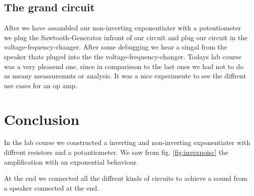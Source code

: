 \documentclass[a4paper,10pt]{article}
\numberwithin{equation}{section}
\begin{document}
\begin{multicols}{2}
  \subsection{The grand circuit}
  After we have assambled our non-inverting exponentiater with a potentiometer we plug the Sawtooth-Generator infront of our circuit and plug our circuit in the voltage-fequency-changer. After some debugging we hear a singal from the speaker thats pluged into the the voltage-frequency-changer. Todays lab course was a very pleasend one, since in comparisson to the last ones we had not to do as meany meassuremnts or analysis. It was a nice experimente to see the diffrent use cases for an op amp.
  \section{Conclusion}
  In the lab course we constructed a inverting and non-inverting exponentiater with diffrent resistors and a potantiometer. We saw from fig. \ref{fig:invexpoisc} the amplification with an exponential behaviour.

  At the end we connected all the diffrent kinds of circuits to achieve a sound from a speaker connected at the end. 
\end{multicols}

\clearpage
\listoffigures
\listoftables



\end{document}

